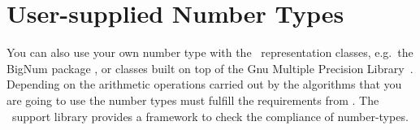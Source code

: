 

\section{User-supplied Number Types}

You can also use your own number type with the \cgal\ representation
classes, e.g.\  the {\sc BigNum} package \cite{BigNum}, or classes
built on top of the {\sc Gnu} Multiple  Precision Library~\cite{Gmp}.
Depending on the arithmetic operations carried out by the algorithms
that you are going to use the number types must fulfill the
requirements from .  The \cgal\ support library 
provides a framework to check the compliance of  number-types. 
